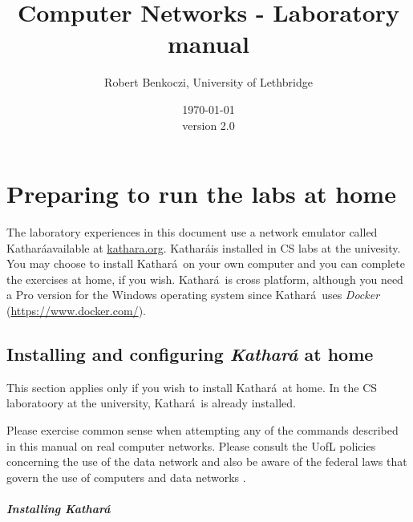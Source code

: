 \documentclass[12pt]{book}
\title{Computer Networks - Laboratory manual}    %
\author{Robert Benkoczi, University of Lethbridge}    %
\date{\today\\ version 2.0}  %
\newcommand{\kathara}{Kathar\'a}
\begin{document}
\frontmatter                            %
\maketitle    
\doclicenseThis                      
\tableofcontents                        %

\mainmatter %

\chapter{Preparing to run the labs at home}\label{intro.se}

The laboratory experiences in this document use a network emulator called \kathara available at \url{kathara.org}. \kathara is installed in CS labs at the univesity. You may choose to install \kathara\ on your own computer and you can complete the exercises at home, if you wish. \kathara\ is cross platform, although you need a Pro version for the Windows operating system since \kathara\ uses \emph{Docker} (\url{https://www.docker.com/}).

\section{Installing and configuring \emph{\kathara} at home}

This section applies only if you wish to install \kathara\ at home. In the CS laboratoory at the university, \kathara\ is already installed.

\begin{tcolorbox}[title=Lab safety note]
  Please exercise common sense when attempting any
  of the commands described in this manual on real computer
  networks. Please consult the UofL policies concerning the use of the
  data network \cite{its-policies} and also be aware of the federal
  laws that govern the use of computers and data networks
  \cite{law-canada,law-us}. 
\end{tcolorbox}

\paragraph{Installing \kathara}
\end{document}
